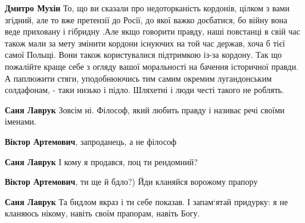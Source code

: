 \begin{itemize}
\begin{itemize}
\begin{itemize}
\textbf{Дмитро Мухін} То, що ви сказали про недоторканість кордонів, цілком з
вами згідний, але то вже претензії до Росії, до якої важко доєбатися, бо війну
вона веде приховану і гібридну .Але якщо говорити правду, наші повстанці в свій
час також мали за мету змінити кордони існуючих на той час держав, хоча б тієї
самої Польщі. Вони також користувалися підтримкою із-за кордону. Так що
пожалійте краще себе з огляду вашої моральності на бачення історичної правди. А
паплюжити стяги, уподобнюючись тим самим окремим лугандонським солдафонам, -
таки низько і підло. Шляхетні і люди честі такого не роблять.

 
\textbf{Саня Лаврук} Зовсім ні. Філософ, який любить правду і називає речі своїми іменами.

 
\textbf{Віктор Артемович}, запроданець, а не філософ

 
\textbf{Саня Лаврук} І кому я продався, поц ти рендомний?

 
\textbf{Віктор Артемович}, ти ще й бдло?) Йди кланяйся ворожому прапору

 
\textbf{Саня Лаврук} Та бидлом якраз і ти себе показав. І запам‘ятай придурку: я не кланяюсь нікому, навіть своїм прапорам, навіть Богу.


\end{itemize}
\end{itemize}
\end{itemize}
